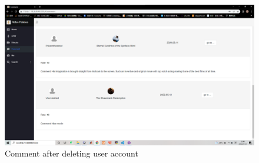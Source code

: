 \begin{CJK*}{UTF8}{gbsn}
    \begin{figure}[htbp]
    \centering
    \includegraphics[width=1\textwidth]{res_delete2.png}
    \caption{Comment after deleting user account}
    \end{figure}
\end{CJK*}

